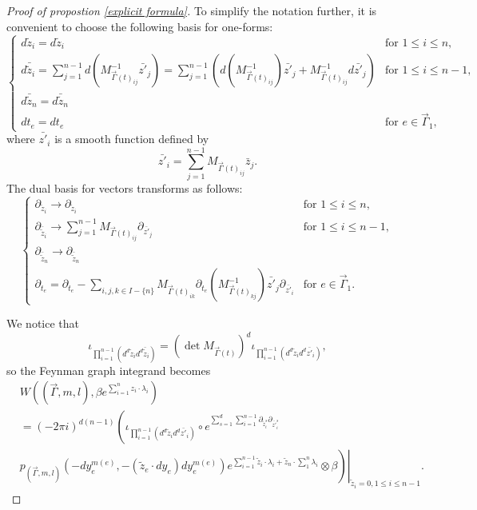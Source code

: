 \documentclass[11pt]{amsart}
\theoremstyle{definition}
\theoremstyle{remark}
\numberwithin{equation}{section}
\begin{document}
\begin{proof}[Proof of propostion \ref{explicit formula}]
To simplify the notation further, it is convenient to choose the following basis for one-forms:
    $$
    \begin{cases}
        d\tilde{z}_{i}=d\tilde{z}_{i}&\text{for }1\leq i\leq n,\\
        d\bar{\tilde{z}}_{i}=\sum_{j=1}^{n-1}d\left(
        M^{-1}_{\vec{\Gamma}(t)_{ij}}\bar{z'}_{j}
        \right)=\sum_{j=1}^{n-1}\left(
        d(M^{-1}_{\vec{\Gamma}(t)_{ij}})\bar{z'}_{j}+M^{-1}_{\vec{\Gamma}(t)_{ij}}d\bar{z'}_{j}
        \right) &\text{for }1\leq i\leq n-1,\\
        d\bar{\tilde{z}}_{n}=d\bar{\tilde{z}}_{n}\\
        dt_{e}=dt_{e}&\text{for }e\in\vec{\Gamma}_{1},
    \end{cases}
    $$
    where $\bar{z'}_{i}$ is a smooth function defined by
    $$
    \bar{z'}_{i}=\sum_{j=1}^{n-1}M_{\vec{\Gamma}(t)_{ij}}\bar{z}_{j}.
    $$
    The dual basis for vectors transforms as follows:
    $$
    \begin{cases}
        \partial_{\tilde{z}_{i}}\rightarrow \partial_{\tilde{z}_{i}}&\text{for }1\leq i\leq n,\\
        \partial_{\bar{\tilde{z}}_{i}}\rightarrow \sum_{j=1}^{n-1}
        M_{\vec{\Gamma}(t)_{ij}}\partial_{\bar{z'}_{j}}
         &\text{for }1\leq i\leq n-1,\\
        \partial_{\bar{\tilde{z}}_{n}}\rightarrow \partial_{\bar{\tilde{z}}_{n}}\\
        \partial_{t_{e}}=\partial_{t_{e}}-\sum_{i,j,k\in  I-\{n\}}M_{\vec{\Gamma}(t)_{ik}}\partial_{t_{e}}(M^{-1}_{\vec{\Gamma}(t)_{kj}})\bar{z'}_{j}\partial_{\bar{z'}_{i}}&\text{for }e\in\vec{\Gamma}_{1}.
        
    \end{cases}
    $$

    We notice that
    $$
    \iota_{\prod_{i=1}^{n-1}(d^{d}\tilde{z}_{i}d^{d}\bar{\tilde{z}}_{i})}=(\det M_{\vec{\Gamma}(t)})^{d}\iota_{\prod_{i=1}^{n-1}(d^{d}\tilde{z}_{i}d^{d}\bar{z'}_{i})},
    $$
    so the Feynman graph integrand becomes
    \begin{align*}
        &W((\vec{\Gamma},m,l),\beta e^{\sum_{i=1}^{n}z_{i}\cdot\lambda_{i}})\\
        &=(-2\pi i)^{d(n-1)}\left(
        \iota_{\prod_{i=1}^{n-1}(d^{d}\tilde{z}_{i}d^{d}\bar{z'}_{i})}
        \circ
        e^{\sum_{s=1}^{d}\sum_{i=1}^{n-1}\partial_{\tilde{z}_{i}^{s}}\partial_{\bar{z'}_{i}^{s}}}
        \right.\\
        &\left.\left.p_{(\vec{\Gamma},m,l)}(-dy_{e}^{m(e)},-(\tilde{z}_{e}\cdot dy_{e})dy_{e}^{m(e)})e^{\sum_{i=1}^{n-1}\tilde{z}_{i}\cdot\lambda_{i}+\tilde{z}_{n}\cdot\sum_{1}^{n}\lambda_{i}}\otimes \beta\right)\right|_{\tilde{z}_{i}=0,1\leq i\leq n-1}.
    \end{align*}


\end{proof}
\end{document}
